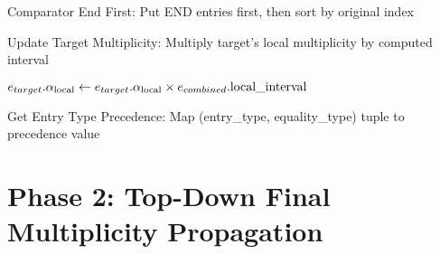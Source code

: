 \begin{algorithm}[H]
\caption{Comparator End First: Put END entries first, then sort by original index}
\label{alg:comparator-end-first}
\begin{algorithmic}[1]
    \EndIf
    \Else
    \EndIf
\EndFunction
\end{algorithmic}
\end{algorithm}

\begin{algorithm}[H]
\caption{Update Target Multiplicity: Multiply target's local multiplicity by computed interval}
\label{alg:update-target-multiplicity}
\begin{algorithmic}[1]
    \State $e_{target}.\alpha_{\text{local}} \leftarrow e_{target}.\alpha_{\text{local}} \times e_{combined}.\text{local\_interval}$
\EndFunction
\end{algorithmic}
\end{algorithm}

\begin{algorithm}[H]
\caption{Get Entry Type Precedence: Map (entry\_type, equality\_type) tuple to precedence value}
\label{alg:get-precedence}
\begin{algorithmic}[1]
    \EndIf
\EndFunction
\end{algorithmic}
\end{algorithm}




\section{Phase 2: Top-Down Final Multiplicity Propagation}
\label{sec:top-down}

